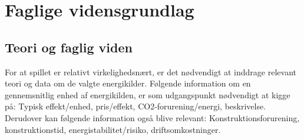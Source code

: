 \documentclass[a4paper,12pt]{report}
\begin{document}
\section{Faglige vidensgrundlag}
\subsection{Teori og faglig viden}
For at spillet er relativt virkelighedsnært, er det nødvendigt at inddrage relevant teori og data om de valgte energikilder. Følgende information om en gennemsnitlig enhed af energikilden, er som udgangspunkt nødvendigt at kigge på: Typisk effekt/enhed, pris/effekt, CO2-forurening/energi, beskrivelse. Derudover kan følgende information også blive relevant: Konstruktionsforurening, konstruktionstid, energistabilitet/risiko, driftsomkostninger.
\end{document}
